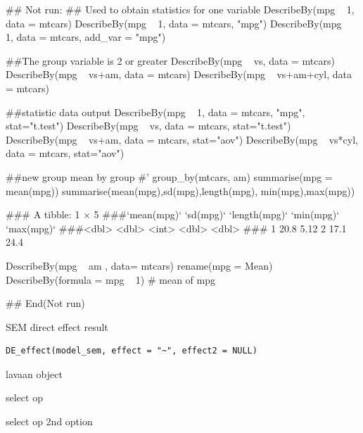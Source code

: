 \documentclass[a4paper]{book}
\begin{document}
\begin{Examples}
\begin{ExampleCode}
## Not run: 
## Used to obtain statistics for one variable
DescribeBy(mpg ~ 1, data = mtcars)
DescribeBy(mpg ~ 1, data = mtcars, "mpg")
DescribeBy(mpg ~ 1, data = mtcars, add_var = "mpg")

##The group variable is 2 or greater
DescribeBy(mpg ~ vs, data = mtcars)
DescribeBy(mpg ~ vs+am, data = mtcars)
DescribeBy(mpg ~ vs+am+cyl, data = mtcars)

##statistic data output
DescribeBy(mpg ~ 1, data = mtcars, "mpg", stat="t.test")
DescribeBy(mpg ~ vs, data = mtcars, stat="t.test")
DescribeBy(mpg ~ vs+am, data = mtcars, stat="aov")
DescribeBy(mpg ~ vs*cyl, data = mtcars, stat="aov")

##new group mean by group
#' group_by(mtcars, am) %
 summarise(mpg = mean(mpg)) %
  summarise(mean(mpg),sd(mpg),length(mpg), min(mpg),max(mpg))

### A tibble: 1 × 5
###`mean(mpg)` `sd(mpg)` `length(mpg)` `min(mpg)` `max(mpg)`
###<dbl>     <dbl>         <int>      <dbl>      <dbl>
###  1        20.8      5.12             2       17.1       24.4

DescribeBy(mpg ~ am , data= mtcars) %
    rename(mpg = Mean) %
      DescribeBy(formula = mpg ~ 1)  # mean of mpg

## End(Not run)



\end{ExampleCode}
\end{Examples}
%
\begin{Description}
SEM direct effect result
\end{Description}
%
\begin{Usage}
\begin{verbatim}
DE_effect(model_sem, effect = "~", effect2 = NULL)
\end{verbatim}
\end{Usage}
%
\begin{Arguments}
\begin{ldescription}
\item[\code{model\_sem}] lavaan object

\item[\code{effect}] select op

\item[\code{effect2}] select op 2nd option
\end{ldescription}
\end{Arguments}
\end{document}
